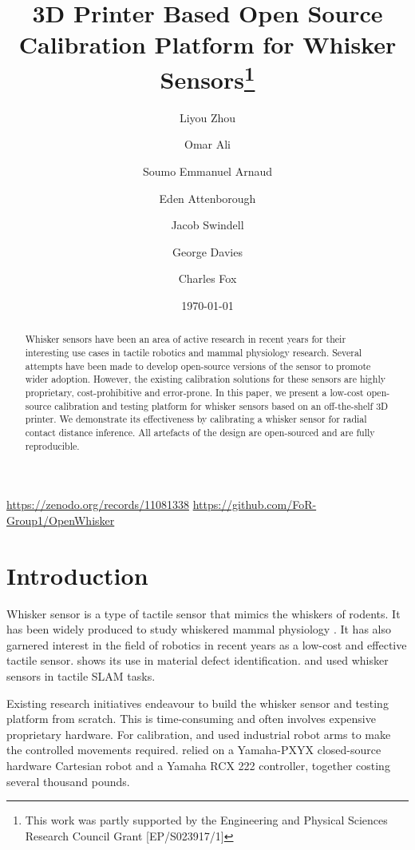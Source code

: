 \documentclass[runningheads]{llncs}
\title{3D Printer Based Open Source Calibration Platform for Whisker Sensors\thanks{This work was partly supported by the Engineering and Physical Sciences
Research Council Grant [EP/S023917/1]}}
\author{
    Liyou Zhou\orcidID{0009-0005-9491-9003} \and
    Omar Ali \orcidID{0009-0009-3523-6084} \and
    Soumo Emmanuel Arnaud \and
    Eden Attenborough \and
    Jacob Swindell \and
    George Davies \and
    Charles Fox
}
\institute{School of Computer Science, University of Lincoln, Lincoln, UK}
\date{\today}
\begin{document}
\maketitle

\vspace{-10pt}

\begin{center}
    \url{https://zenodo.org/records/11081338}
    \url{https://github.com/FoR-Group1/OpenWhisker}
\end{center}

\begin{abstract}
Whisker sensors have been an area of active research in recent years for their interesting use cases in tactile robotics and mammal physiology research. Several attempts have been made to develop open-source versions of the sensor to promote wider adoption. However, the existing calibration solutions for these sensors are highly proprietary, cost-prohibitive and error-prone. In this paper, we present a low-cost open-source calibration and testing platform for whisker sensors based on an off-the-shelf 3D printer. We demonstrate its effectiveness by calibrating a whisker sensor for radial contact distance inference. All artefacts of the design are open-sourced and are fully reproducible.
\end{abstract}

\section{Introduction}

Whisker sensor is a type of tactile sensor that mimics the whiskers of rodents. It has been widely produced to study whiskered mammal physiology \cite{prescottActiveTouchSensing2020}. It has also garnered interest in the field of robotics in recent years as a low-cost and effective tactile sensor. \cite{fotouhiDetectionBarelyVisible2021} shows its use in material defect identification. \cite{struckmeierViTaSLAMBioinspiredVisuoTactile2019} and \cite{foxTactileSLAMBiomimetic2012} used whisker sensors in tactile SLAM tasks.

Existing research initiatives endeavour to build the whisker sensor and testing platform from scratch. This is time-consuming and often involves expensive proprietary hardware. For calibration, \cite{sullivanTactileDiscriminationUsing2012} and \cite{fotouhiDetectionBarelyVisible2021} used industrial robot arms to make the controlled movements required. \cite{evansWhiskerobjectContactSpeed2010} relied on a Yamaha-PXYX closed-source hardware Cartesian robot and a Yamaha RCX 222 controller, together costing several thousand pounds.
\end{document}
